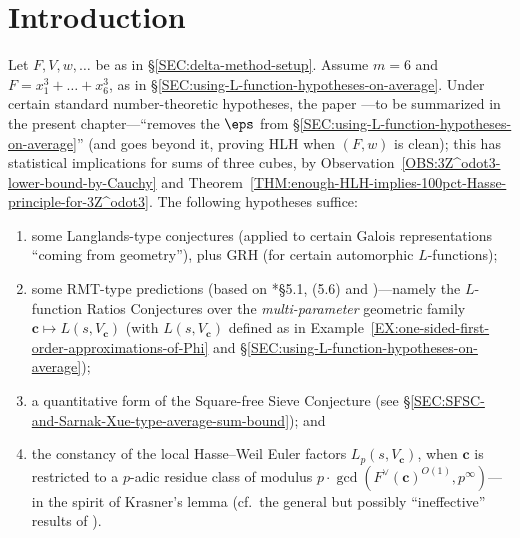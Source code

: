 \documentclass[12pt]{report}
\begin{document}
\section{Introduction}

Let $F,V,w,\dots$ be as in \S\ref{SEC:delta-method-setup}.
Assume $m=6$ and $F=x_1^3+\dots+x_6^3$, as in \S\ref{SEC:using-L-function-hypotheses-on-average}.
Under certain standard number-theoretic hypotheses,
the paper \cite{wang2021_HLH_vs_RMT}---to be summarized in the present chapter---``removes the $\eps$ from \S\ref{SEC:using-L-function-hypotheses-on-average}'' (and goes beyond it, proving HLH when $(F,w)$ is clean);
this has statistical implications for sums of three cubes, by Observation~\ref{OBS:3Z^odot3-lower-bound-by-Cauchy} and Theorem~\ref{THM:enough-HLH-implies-100pct-Hasse-principle-for-3Z^odot3}.
The following hypotheses suffice:
\begin{enumerate}[(1)]
    \item some Langlands-type conjectures
    (applied to certain Galois representations ``coming from geometry''),
    plus GRH
    (for certain automorphic $L$-functions);
    
    \item some RMT-type predictions
    (based on \cite{conrey2008autocorrelation}*{\S5.1, (5.6)} and \cite{sarnak2016families})---namely
    the $L$-function Ratios Conjectures over the \emph{multi-parameter} geometric family $\bm{c}\mapsto L(s,V_{\bm{c}})$ (with $L(s,V_{\bm{c}})$ defined as in Example~\ref{EX:one-sided-first-order-approximations-of-Phi} and \S\ref{SEC:using-L-function-hypotheses-on-average});
    
    \item a quantitative form of the Square-free Sieve Conjecture (see \S\ref{SEC:SFSC-and-Sarnak-Xue-type-average-sum-bound}); and
    
    \item the constancy of the local Hasse--Weil Euler factors $L_p(s,V_{\bm{c}})$,
    when $\bm{c}$ is restricted to a $p$-adic residue class
    of modulus $p\cdot \gcd(F^\vee(\bm{c})^{O(1)}, p^\infty)$---in the spirit of Krasner's lemma (cf.~the general but possibly ``ineffective'' results of \cite{kisin1999local}).
\end{enumerate}
\end{document}
